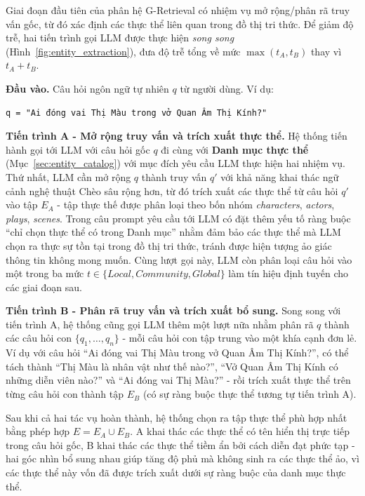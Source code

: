 Giai đoạn đầu tiên của phân hệ G-Retrieval có nhiệm vụ mở rộng/phân rã truy vấn gốc, từ đó xác định các thực thể liên quan trong đồ thị tri thức. Để giảm độ trễ, hai tiến trình gọi LLM được thực hiện \textit{song song} (Hình~\ref{fig:entity_extraction}), đưa độ trễ tổng về mức $\max(t_A, t_B)$ thay vì $t_A + t_B$.

\textbf{Đầu vào.} Câu hỏi ngôn ngữ tự nhiên $q$ từ người dùng. Ví dụ:

\begin{tcolorbox}[colback=gray!5, colframe=black!50, arc=4pt, boxrule=0.5pt]
{\small
\begin{verbatim}
q = "Ai đóng vai Thị Màu trong vở Quan Âm Thị Kính?"
\end{verbatim}
}
\end{tcolorbox}

\textbf{Tiến trình A - Mở rộng truy vấn và trích xuất thực thể.} Hệ thống tiến hành gọi tới LLM với câu hỏi gốc $q$ đi cùng với \textbf{Danh mục thực thể} (Mục~\ref{sec:entity_catalog}) với mục đích yêu cầu LLM thực hiện hai nhiệm vụ. Thứ nhất, LLM cần mở rộng $q$ thành truy vấn $q'$ với khả năng khai thác ngữ cảnh nghệ thuật Chèo sâu rộng hơn, từ đó trích xuất các thực thể từ câu hỏi $q'$ vào tập $E_A$ - tập thực thế được phân loại theo bốn nhóm \textit{characters}, \textit{actors}, \textit{plays}, \textit{scenes}. Trong câu prompt yêu cầu tới LLM có đặt thêm yếu tố ràng buộc ``chỉ chọn thực thể có trong Danh mục''  nhằm đảm bảo các thực thể mà LLM chọn ra thực sự tồn tại trong đồ thị tri thức, tránh được hiện tượng ảo giác thông tin không mong muốn. Cùng lượt gọi này, LLM còn phân loại câu hỏi vào một trong ba mức $t \in \{\textit{Local}, \textit{Community}, \textit{Global}\}$ làm tín hiệu định tuyến cho các giai đoạn sau.

\textbf{Tiến trình B - Phân rã truy vấn và trích xuất bổ sung.} Song song với tiến trình A, hệ thống cũng gọi LLM thêm một lượt nữa nhằm phân rã $q$ thành các câu hỏi con $\{q_1, \ldots, q_n\}$ - mỗi câu hỏi con tập trung vào một khía cạnh đơn lẻ. Ví dụ với câu hỏi ``Ai đóng vai Thị Màu trong vở Quan Âm Thị Kính?'', có thể tách thành ``Thị Màu là nhân vật như thế nào?'', ``Vở Quan Âm Thị Kính có những diễn viên nào?'' và ``Ai đóng vai Thị Màu?'' - rồi trích xuất thực thể trên từng câu hỏi con thành tập $E_B$ (có sự ràng buộc thực thể tương tự tiến trình A). 

Sau khi cả hai tác vụ hoàn thành, hệ thống chọn ra tập thực thể phù hợp nhất bằng phép hợp $E = E_A \cup E_B$. A khai thác các thực thể có tên hiển thị trực tiếp trong câu hỏi gốc, B khai thác các thực thể tiềm ẩn bởi cách diễn đạt phức tạp - hai góc nhìn bổ sung nhau giúp tăng độ phủ mà không sinh ra các thực thể ảo, vì các thực thể này vốn đã được trích xuất dưới sự ràng buộc của danh mục thực thể.

